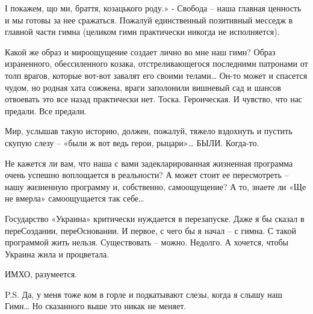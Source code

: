 І покажем, що ми, браття, козацького роду.» - Свобода – наша главная ценность и
мы готовы за нее сражаться. Пожалуй единственный позитивный месседж в главной
части гимна (целиком гимн практически никогда не исполняется).

Какой же образ и мироощущение создает лично во мне наш гимн? Образ израненного,
обессиленного козака, отстреливающегося последними патронами от толп врагов,
которые вот-вот завалят его своими телами… Он-то может и спасется чудом, но
родная хата сожжена, враги заполонили вишневый сад и шансов отвоевать это все
назад практически нет. Тоска. Героическая. И чувство, что нас предали. Все
предали.

Мир, услышав такую историю, должен, пожалуй, тяжело вздохнуть и пустить скупую
слезу – «были ж вот ведь герои, рыцари»… БЫЛИ. Когда-то.

Не кажется ли вам, что наша с вами задекларированная жизненная программа очень
успешно воплощается в реальности? А может стоит ее пересмотреть – нашу
жизненную программу и, собственно, самоощущение? А то, знаете ли «Ще не вмерла»
самоощущается так себе… 

Государство «Украина» критически нуждается в перезапуске. Даже я бы сказал в
переСоздании, переОсновании. И первое, с чего бы я начал – с гимна. С такой
программой жить нельзя. Существовать – можно. Недолго. А хочется, чтобы Украина
жила и процветала. 

ИМХО, разумеется.

P.S. Да, у меня тоже ком в горле и подкатывают слезы, когда я слышу наш Гимн…
Но сказанного выше это никак не меняет.

